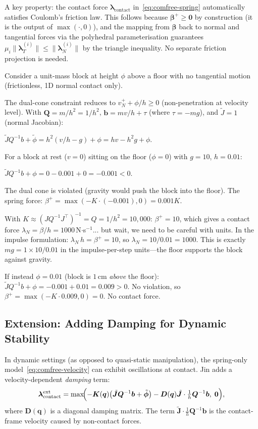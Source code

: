 \documentclass[11pt,twoside]{report}
\theoremstyle{definition}
\theoremstyle{plain}
\theoremstyle{remark}
\newcommand{\q}{\bm{q}}
\newcommand{\0}{\bm{0}}
\newcommand{\J}{\bm{J}}
\begin{document}
A key property: the contact force $\bm{\lambda}_{\text{contact}}$ in~\eqref{eq:comfree-spring}
automatically satisfies Coulomb's friction law.  This follows because
$\bm{\beta}^{+}\ge\0$ by construction (it is the output of $\max(\cdot,0)$),
and the mapping from $\bm{\beta}$ back to normal and tangential forces
via the polyhedral parameterisation guarantees
$\mu_{i}\|\bm{\lambda}_{T}^{(i)}\|\le\|\bm{\lambda}_{N}^{(i)}\|$
by the triangle inequality. No separate friction projection is needed.

\begin{examplebox}
Consider a unit-mass block at height $\phi$ above a floor with no tangential
motion (frictionless, 1D normal contact only).

The dual-cone constraint reduces to $v_{N}^{+}+\phi/h\ge 0$ (non-penetration
at velocity level).  With $\bm{Q}=m/h^{2}=1/h^{2}$, $\bm{b}=mv/h+\tau$
(where $\tau=-mg$), and $\tilde{J}=1$ (normal Jacobian):

$\tilde{J}Q^{-1}b+\tilde{\phi}=h^{2}(v/h-g)+\phi=hv-h^{2}g+\phi.$

For a block at rest ($v=0$) sitting on the floor ($\phi=0$) with $g=10$, $h=0.01$:

$\tilde{J}Q^{-1}b+\phi=0-0.001+0=-0.001<0.$

The dual cone is violated (gravity would push the block into the floor).
The spring force:
$\beta^{+}=\max(-K\cdot(-0.001),0)=0.001K.$

With $K\approx (JQ^{-1}J^{\!\top})^{-1}=Q=1/h^{2}=10{,}000$:
$\beta^{+}=10$, which gives a contact force $\lambda_{N}=\beta/h=1000$\,N$\cdot$s$^{-1}$...
but wait, we need to be careful with units.
In the impulse formulation: $\lambda_{N}\,h=\beta^{+}=10$, so $\lambda_{N}=10/0.01=1000$.
This is exactly $mg=1\times 10/0.01$ in the impulse-per-step units---the floor
supports the block against gravity.  \checkmark

If instead $\phi=0.01$ (block is $1$\,cm \emph{above} the floor):
$\tilde{J}Q^{-1}b+\phi=-0.001+0.01=0.009>0$.
No violation, so $\beta^{+}=\max(-K\cdot 0.009,0)=0$.  No contact force.  \checkmark
\end{examplebox}

\subsection{Extension: Adding Damping for Dynamic Stability}

In dynamic settings (as opposed to quasi-static manipulation), the spring-only
model~\eqref{eq:comfree-velocity} can exhibit oscillations at contact.
Jin adds a velocity-dependent \emph{damping} term:
\begin{equation}\label{eq:comfree-damped}
\bm{\lambda}_{\text{contact}}^{\text{ext}}=\max\!\Bigl(
-\bm{K}(\q)\bigl(\tilde{\J}\bm{Q}^{-1}\bm{b}+\tilde{\bm{\phi}}\bigr)
-\bm{D}(\q)\tilde{\J}\cdot\tfrac{1}{h}\bm{Q}^{-1}\bm{b},\;\0\Bigr),
\end{equation}
where $\bm{D}(\q)$ is a diagonal damping matrix.  The term
$\tilde{\J}\cdot\frac{1}{h}\bm{Q}^{-1}\bm{b}$ is the contact-frame velocity
caused by non-contact forces.
\end{document}
